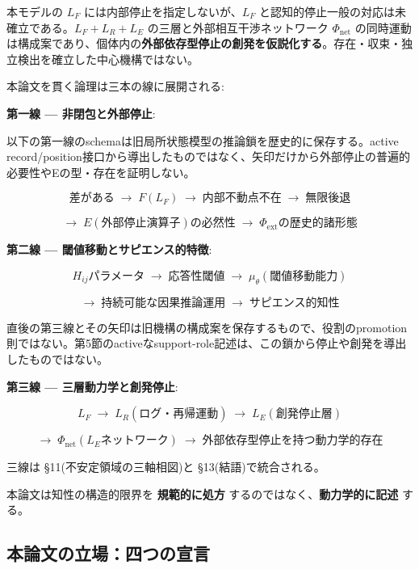 本モデルの $L_F$ には内部停止を指定しないが、$L_F$ と認知的停止一般の対応は未確立である。$L_F + L_R + L_E$ の三層と外部相互干渉ネットワーク $\Phi_{\text{net}}$ の同時運動は構成案であり、個体内の\textbf{外部依存型停止の創発を仮説化する}。存在・収束・独立検出を確立した中心機構ではない。

本論文を貫く論理は三本の線に展開される:

\textbf{第一線 — 非閉包と外部停止}:

\noindent 以下の第一線のschemaは旧局所状態模型の推論鎖を歴史的に保存する。active record/position接口から導出したものではなく、矢印だけから外部停止の普遍的必要性やEの型・存在を証明しない。

\[
\text{差がある} \;\longrightarrow\; F(L_F) \;\longrightarrow\; \text{内部不動点不在} \;\longrightarrow\; \text{無限後退}
\]

\[
\longrightarrow\; E(\text{外部停止演算子})\text{の必然性} \;\longrightarrow\; \Phi_{\text{ext}}\text{の歴史的諸形態}
\]

\textbf{第二線 — 閾値移動とサピエンス的特徴}:

\[
H_{ij}\text{パラメータ} \;\longrightarrow\; \text{応答性閾値} \;\longrightarrow\; \mu_\theta(\text{閾値移動能力})
\]

\[
\longrightarrow\; \text{持続可能な因果推論運用} \;\longrightarrow\; \text{サピエンス的知性}
\]

直後の第三線とその矢印は旧機構の構成案を保存するもので、役割のpromotion則ではない。第5節のactiveなsupport-role記述は、この鎖から停止や創発を導出したものではない。

\textbf{第三線 — 三層動力学と創発停止}:

\[
L_F \;\longrightarrow\; L_R(\text{ログ・再帰運動}) \;\longrightarrow\; L_E(\text{創発停止層})
\]

\[
\longrightarrow\; \Phi_{\text{net}}(L_E\text{ネットワーク}) \;\longrightarrow\; \text{外部依存型停止を持つ動力学的存在}
\]

三線は \S{}11(不安定領域の三軸相図)と \S{}13(結語)で統合される。

本論文は知性の構造的限界を \textbf{規範的に処方} するのではなく、\textbf{動力学的に記述} する。

\bigskip

\subsection*{本論文の立場：四つの宣言}

